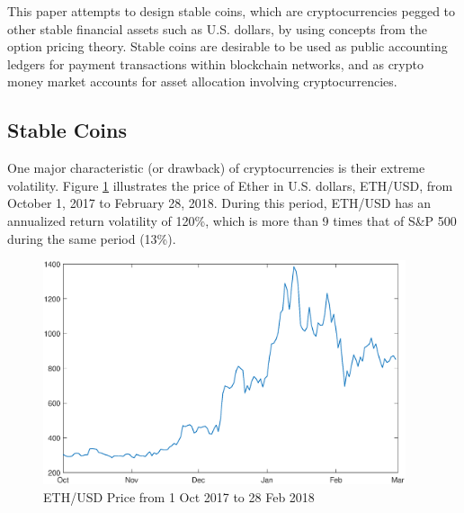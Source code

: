 \documentclass[draft, noinfoline]{ectaart}
\numberwithin{equation}{section}
\theoremstyle{plain}
\begin{document}



This paper attempts to design stable coins, which are cryptocurrencies pegged to other stable financial assets such as U.S. dollars, by using concepts from the option pricing theory.  Stable coins are desirable to be used as public accounting ledgers for payment transactions within  blockchain networks, and as crypto money market accounts for asset allocation involving cryptocurrencies.


\subsection{Stable Coins}

One major characteristic (or drawback) of cryptocurrencies is their extreme volatility.
Figure \ref{fig:ethprice} illustrates the price of Ether in U.S. dollars, ETH/USD, from October 1, 2017 to February 28, 2018. During this period, ETH/USD has an annualized return volatility of 120\%, which is more than 9 times that of S\&P 500 during the same period (13\%).





\begin{figure}[!htb]
\begin{centering}
\includegraphics[width=0.95\textwidth]{eth_price}
\par\end{centering}
\caption{ETH/USD Price from 1 Oct 2017 to 28 Feb 2018}\label{fig:ethprice}
\end{figure}
\end{document}
